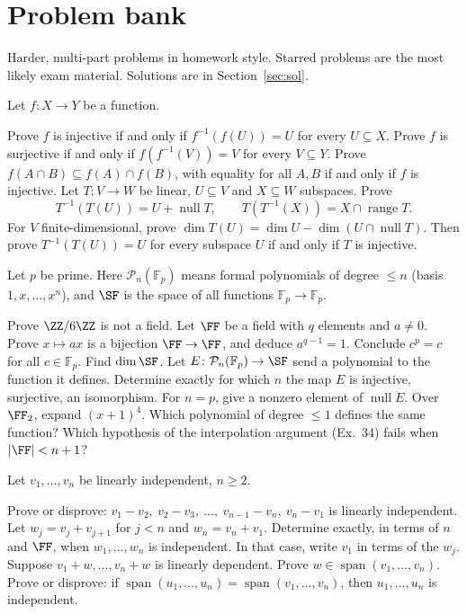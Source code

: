 \documentclass[11pt]{scrartcl}
\DeclareMathOperator{\nul}{null}
\DeclareMathOperator{\range}{range}
\DeclareMathOperator{\spn}{span}
\newcommand{\PP}{\mathcal P}
\newcommand{\Fp}{\mathbb F_p}
\begin{document}
\endgroup
\clearpage
\section{Problem bank}
Harder, multi-part problems in homework style. Starred problems are the most likely exam material. Solutions are in Section~\ref{sec:sol}.

\begin{problem}
  Let $f\colon X\to Y$ be a function.
  \begin{enumerate}[(a)]
    \ii Prove $f$ is injective if and only if $f^{-1}(f(U))=U$ for every $U\subseteq X$.
    \ii Prove $f$ is surjective if and only if $f(f^{-1}(V))=V$ for every $V\subseteq Y$.
    \ii Prove $f(A\cap B)\subseteq f(A)\cap f(B)$, with equality for all $A,B$ if and only if $f$ is injective.
    \ii Let $T\colon V\to W$ be linear, $U\subseteq V$ and $X\subseteq W$ subspaces. Prove
    \[ T^{-1}(T(U))=U+\nul T, \qquad T(T^{-1}(X))=X\cap\range T. \]
    \ii For $V$ finite-dimensional, prove $\dim T(U)=\dim U-\dim(U\cap\nul T)$.
    Then prove $T^{-1}(T(U))=U$ for every subspace $U$ if and only if $T$ is injective.
  \end{enumerate}
\end{problem}

\begin{problem}
  Let $p$ be prime. Here $\PP_n(\Fp)$ means formal polynomials of degree $\le n$ (basis $1,x,\dots,x^n$), and $\SF$ is the space of all functions $\Fp\to\Fp$.
  \begin{enumerate}[(a)]
    \ii Prove $\ZZ/6\ZZ$ is not a field.
    \ii Let $\FF$ be a field with $q$ elements and $a\ne0$.
    Prove $x\mapsto ax$ is a bijection $\FF\to\FF$, and deduce $a^{q-1}=1$.
    Conclude $c^p=c$ for all $c\in\Fp$.
    \ii Find $\dim\SF$.
    Let $E\colon\PP_n(\Fp)\to\SF$ send a polynomial to the function it defines.
    Determine exactly for which $n$ the map $E$ is injective, surjective, an isomorphism.
    For $n=p$, give a nonzero element of $\nul E$.
    \ii Over $\FF_2$, expand $(x+1)^4$.
    Which polynomial of degree $\le 1$ defines the same function?
    Which hypothesis of the interpolation argument (Ex.~34) fails when $|\FF|<n+1$?
  \end{enumerate}
\end{problem}

\begin{problem}
  Let $v_1,\dots,v_n$ be linearly independent, $n\ge2$.
  \begin{enumerate}[(a)]
    \ii Prove or disprove: $v_1-v_2,\ v_2-v_3,\ \dots,\ v_{n-1}-v_n,\ v_n-v_1$ is linearly independent.
    \ii Let $w_j=v_j+v_{j+1}$ for $j<n$ and $w_n=v_n+v_1$.
    Determine exactly, in terms of $n$ and $\FF$, when $w_1,\dots,w_n$ is independent.
    In that case, write $v_1$ in terms of the $w_j$.
    \ii Suppose $v_1+w,\dots,v_n+w$ is linearly dependent. Prove $w\in\spn(v_1,\dots,v_n)$.
    \ii Prove or disprove: if $\spn(u_1,\dots,u_n)=\spn(v_1,\dots,v_n)$, then $u_1,\dots,u_n$ is independent.
  \end{enumerate}
\end{problem}
\end{document}
